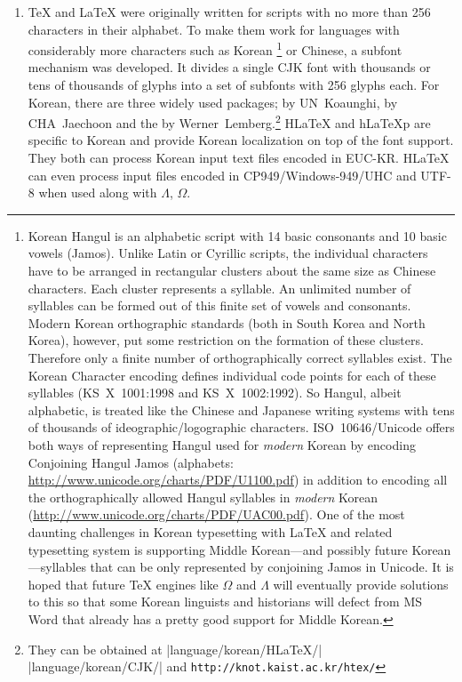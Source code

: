 \begin{enumerate}
\item \TeX{} and \LaTeX{} were originally written for
scripts with no more than 256 characters in their alphabet.
To make them work for languages with considerably 
more characters such as
Korean%
 \footnote{Korean Hangul is an alphabetic script with 14 basic consonants
 and 10 basic vowels (Jamos). Unlike Latin or Cyrillic scripts, the
 individual characters have to be arranged in rectangular
 clusters about the same size as Chinese characters. Each cluster
 represents a syllable. An unlimited number of syllables can be
 formed out of this finite set of vowels and consonants. Modern Korean
 orthographic standards (both in South Korea and  North Korea), however,
 put some restriction on the formation of these clusters.
 Therefore only a finite number of  orthographically correct syllables exist.
 The Korean Character encoding defines individual code points for each of these syllables (KS~X~1001:1998 and KS~X~1002:1992). So Hangul, albeit alphabetic, is
 treated like the Chinese and Japanese writing systems with tens of thousands of
 ideographic/logographic characters.  ISO~10646/Unicode offers both ways of
 representing Hangul used for \emph{modern} Korean by encoding Conjoining
 Hangul Jamos (alphabets: \url{http://www.unicode.org/charts/PDF/U1100.pdf})
 in addition to encoding all the orthographically allowed Hangul syllables in
 \emph{modern} Korean (\url{http://www.unicode.org/charts/PDF/UAC00.pdf}).
 One of the most daunting challenges in Korean typesetting with
 \LaTeX{} and related typesetting system is supporting Middle Korean---and possibly future Korean---syllables that can be only represented
 by conjoining Jamos in Unicode. It is hoped that future \TeX{} engines like $\Omega$ and
 $\Lambda$ will eventually provide solutions to this
 so that some Korean linguists and historians
 will defect from MS Word that already has  a pretty good support 
 for Middle Korean.}
or Chinese, a subfont mechanism was developed.
It divides a single CJK font with  thousands or tens of thousands of
glyphs into a set of subfonts with 256 glyphs each. 
For Korean, there are three widely used packages;  
by UN~Koaunghi,  by CHA~Jaechoon and the 
by Werner~Lemberg.\footnote{%
They can be obtained at \CTANref|language/korean/HLaTeX/|\\
   \CTANref|language/korean/CJK/| and
   \texttt{http://knot.kaist.ac.kr/htex/}}
H\LaTeX{} and h\LaTeX{}p are specific to Korean and provide
Korean localization on top of the font support.
They both can process Korean input text files encoded in EUC-KR. H\LaTeX{} can
even process input files encoded in CP949/Windows-949/UHC and UTF-8
when used along with $\Lambda$, $\Omega$.


\end{enumerate}
